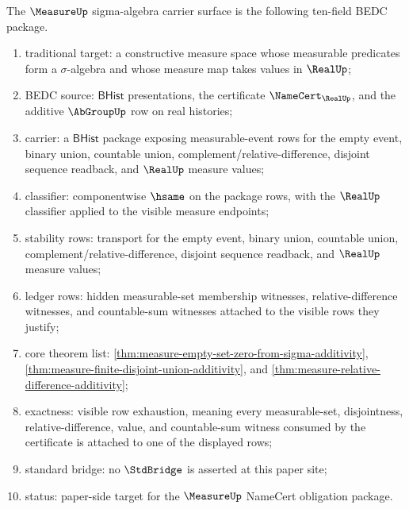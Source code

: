\begin{definition}
\label{def:measure-sigma-algebra-carrier-surface}
The $\MeasureUp$ sigma-algebra carrier surface is the following ten-field
BEDC package.
\begin{enumerate}
  \item traditional target: a constructive measure space whose measurable
  predicates form a $\sigma$-algebra and whose measure map takes values in
  $\RealUp$;
  \item BEDC source: $\mathsf{BHist}$ presentations, the certificate
  $\NameCert_{\RealUp}$, and the additive $\AbGroupUp$ row on real histories;
  \item carrier: a $\mathsf{BHist}$ package exposing measurable-event rows
  for the empty event, binary union, countable union,
  complement/relative-difference, disjoint sequence readback, and $\RealUp$
  measure values;
  \item classifier: componentwise $\hsame$ on the package rows, with the
  $\RealUp$ classifier applied to the visible measure endpoints;
  \item stability rows: transport for the empty event, binary union,
  countable union, complement/relative-difference, disjoint sequence readback,
  and $\RealUp$ measure values;
  \item ledger rows: hidden measurable-set membership witnesses,
  relative-difference witnesses, and countable-sum witnesses attached to the
  visible rows they justify;
  \item core theorem list:
  \autoref{thm:measure-empty-set-zero-from-sigma-additivity},
  \autoref{thm:measure-finite-disjoint-union-additivity}, and
  \autoref{thm:measure-relative-difference-additivity};
  \item exactness: visible row exhaustion, meaning every measurable-set,
  disjointness, relative-difference, value, and countable-sum witness consumed
  by the certificate is attached to one of the displayed rows;
  \item standard bridge: no $\StdBridge$ is asserted at this paper site;
  \item status: paper-side target for the $\MeasureUp$ NameCert obligation
  package.
\end{enumerate}
\end{definition}

